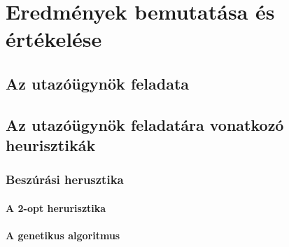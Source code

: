 \chapter{Eredmények bemutatása és értékelése}\label{ch:elemzes}


\section{Az utazóügynök feladata}


\section{Az utazóügynök feladatára vonatkozó heurisztikák}



\subsection{Beszúrási herusztika}


\subsubsection{A 2-opt herurisztika}



\subsubsection{A genetikus algoritmus}


